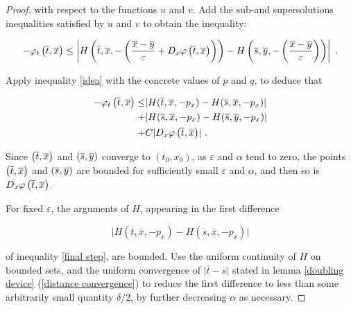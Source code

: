 \begin{theorem}
\begin{proof}
		  		with respect to the functions $ u $ and $ v. $ Add the sub-and supersolutions inequalities satisfied by $ u $ and $ v $ to obtain the inequality:
		  		
		  		\begin{equation*}
		  			- \varphi_t\left(\overline{t}, \overline{x}\right) 
		  			\leq \left\lvert H \left( \overline{t}, \overline{x}, - \left( \frac{\overline{x} - \overline{y}}{\varepsilon} + D_x \varphi\left(\overline{t}, \overline{x}\right) \right)  \right)
		  			- H \left( \overline{s}, \overline{y}, - \left( \frac{\overline{x} - \overline{y}}{\varepsilon} \right) \right) \right\rvert \ .
		  		\end{equation*}
		  		
		  		Apply inequality \eqref{idea} with the concrete values of $ p $ and $ q $, to deduce that
		  		
		  		\begin{equation}
		  		\label{final step}
		  			\begin{split}
		  				- \varphi_t\left(\overline{t}, \overline{x}\right) \leq
		  				&\lvert H(\overline{t}, \overline{x}, -p_x) - H(\overline{s}, \overline{x}, -p_x) \rvert \\
		  				+&\lvert H(\overline{s}, \overline{x}, -p_x) - H(\overline{s}, \overline{y}, -p_x) \rvert \\
		  				+& C \lvert D_x \varphi\left(\overline{t}, \overline{x}\right) \rvert \ .
		  			\end{split}
		  		\end{equation}
		  		
		  		Since $ \left(\overline{t}, \overline{x}\right) $ and $ \left(\overline{s}, \overline{y}\right) $ converge to $ (t_0, x_0) $, as $ \varepsilon $ and $ \alpha $ tend to zero, the points $ \left(\overline{t}, \overline{x}\right) $ and $ \left(\overline{s}, \overline{y}\right) $ are bounded for sufficiently small $ \varepsilon $ and $ \alpha $, and then so is $ D_x \varphi\left(\overline{t}, \overline{x}\right) $.
		  		
		  		For fixed $ \varepsilon $, the arguments of $ H $, appearing in the first difference 
		  		
		  		\begin{equation*}
		  			\lvert H(\overline{t}, \overline{x}, -p_x) - H(\overline{s}, \overline{x}, -p_x) \rvert 
		  		\end{equation*}
		  		
		  		of inequality \eqref{final step}, 
		  		are bounded. Use the uniform continuity of $ H $ on bounded sets, and the uniform convergence of $ \lvert \overline{t} - \overline{s} \rvert $ stated in lemma \ref{doubling device} (\ref{distance convergence}) to reduce the first difference to less than some arbitrarily small quantity $ \delta / 2 $, by further decreasing $ \alpha $ as necessary.
		  		

\end{proof}
\end{theorem}
